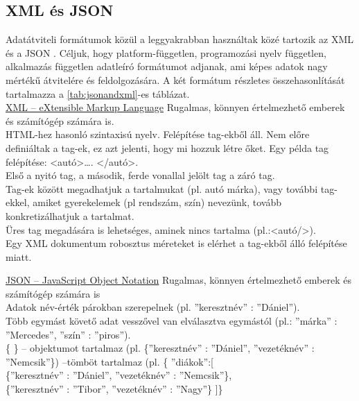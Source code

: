 \subsection{XML és JSON}
Adatátviteli formátumok közül a leggyakrabban használtak közé tartozik az XML és a JSON \cite{nurseitov2009comparison}. Céljuk, hogy platform-független, programozási nyelv független, alkalmazás független adatleíró formátumot adjanak, ami képes adatok nagy mértékű átvitelére és feldolgozására. A két formátum részletes összehasonlítását tartalmazza a \ref{tab:jsonandxml}-es táblázat.
\newline
\\ \underline{XML – eXtensible Markup Language}
\vspace{10pt}
\newline \noindent Rugalmas, könnyen értelmezhető emberek és számítógép számára is.  
\vspace{5pt}\\HTML-hez hasonló szintaxisú nyelv. Felépítése tag-ekből áll. Nem előre definiáltak a tag-ek, ez azt jelenti, hogy mi hozzuk létre őket. Egy példa tag felépítése: <autó>…. </autó>.
\vspace{5pt}\\Első a nyitó tag, a második, ferde vonallal jelölt tag a záró tag.
\\Tag-ek között megadhatjuk a tartalmukat (pl. autó márka), vagy további tag-ekkel, amiket gyerekelemek (pl rendszám, szín) nevezünk, tovább konkretizálhatjuk a tartalmat.
\\Üres tag megadására is lehetséges, aminek nincs tartalma (pl.:<autó/>).
\vspace{5pt}\\Egy XML dokumentum robosztus méreteket is elérhet a tag-ekből álló felépítése miatt.
\newline

\noindent \underline{JSON – JavaScript Object Notation}
\vspace{10pt}
\newline \noindent Rugalmas, könnyen értelmezhető emberek és számítógép számára is
\vspace{5pt}\\ Adatok név-érték párokban szerepelnek (pl. ”keresztnév” : ”Dániel”).
\\Több egymást követő adat vesszővel van elválasztva egymástól (pl.: ”márka” : ”Mercedes”, ”szín” : ”piros”).
\\ \{ \} – objektumot tartalmaz (pl. \{”keresztnév” : ”Dániel”, ”vezetéknév” : ”Nemcsik”\})
\newline [ ] –tömböt tartalmaz (pl. \{ ”diákok”:[
\\  \indent	\{”keresztnév” : ”Dániel”, ”vezetéknév” : ”Nemcsik”\},
\\  \indent \{”keresztnév” : ”Tibor”, ”vezetéknév” : ”Nagy”\}
]\}

